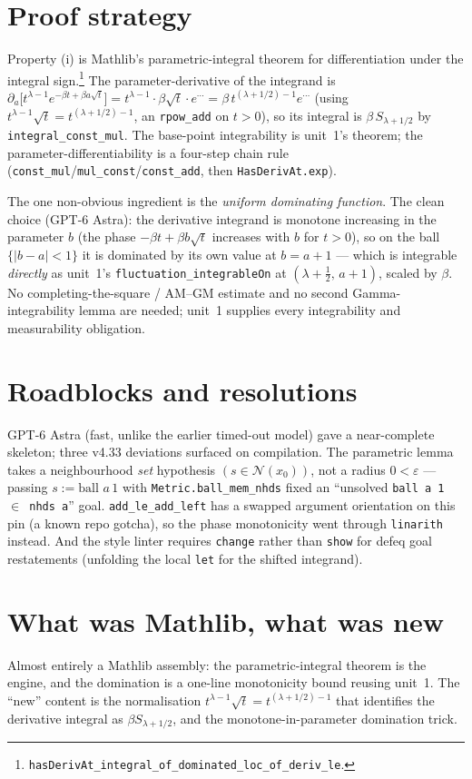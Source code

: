 \documentclass[11pt]{article}
\begin{document}
\section{Proof strategy}
Property (i) is Mathlib's parametric-integral theorem for differentiation under the integral
sign.\footnote{\texttt{hasDerivAt\_integral\_of\_dominated\_loc\_of\_deriv\_le}.} The parameter-derivative of the
integrand is $\partial_a\big[t^{\lambda-1}e^{-\beta t+\beta a\sqrt t}\big]
=t^{\lambda-1}\!\cdot\!\beta\sqrt t\cdot e^{\cdots}=\beta\,t^{(\lambda+1/2)-1}e^{\cdots}$ (using
$t^{\lambda-1}\sqrt t=t^{(\lambda+1/2)-1}$, an \texttt{rpow\_add} on $t>0$), so its integral is
$\beta\,S_{\lambda+1/2}$ by \texttt{integral\_const\_mul}. The base-point integrability is unit~1's
theorem; the parameter-differentiability is a four-step chain rule
(\texttt{const\_mul}/\texttt{mul\_const}/\texttt{const\_add}, then \texttt{HasDerivAt.exp}).

The one non-obvious ingredient is the \emph{uniform dominating function}. The clean choice
(GPT-6 Astra): the derivative integrand is monotone increasing in the parameter $b$ (the phase
$-\beta t+\beta b\sqrt t$ increases with $b$ for $t>0$), so on the ball $\{|b-a|<1\}$ it is dominated
by its own value at $b=a+1$ --- which is integrable \emph{directly} as unit~1's
\texttt{fluctuation\_integrableOn} at $(\lambda+\tfrac12,\,a+1)$, scaled by $\beta$. No
completing-the-square / AM--GM estimate and no second Gamma-integrability lemma are needed; unit~1
supplies every integrability and measurability obligation.

\section{Roadblocks and resolutions}
GPT-6 Astra (fast, unlike the earlier timed-out model) gave a near-complete skeleton; three v4.33
deviations surfaced on compilation. The parametric lemma takes a neighbourhood \emph{set}
hypothesis $(s\in\mathcal N(x_0))$, not a radius $0<\varepsilon$ --- passing $s:=\text{ball }a\,1$ with
\texttt{Metric.ball\_mem\_nhds} fixed an ``unsolved \texttt{ball a 1 $\in$ nhds a}'' goal.
\texttt{add\_le\_add\_left} has a swapped argument orientation on this pin (a known repo gotcha), so
the phase monotonicity went through \texttt{linarith} instead. And the style linter requires
\texttt{change} rather than \texttt{show} for defeq goal restatements (unfolding the local
\texttt{let} for the shifted integrand).

\section{What was Mathlib, what was new}
Almost entirely a Mathlib assembly: the parametric-integral theorem is the engine, and the
domination is a one-line monotonicity bound reusing unit~1. The ``new'' content is the normalisation
$t^{\lambda-1}\sqrt t=t^{(\lambda+1/2)-1}$ that identifies the derivative integral as $\beta
S_{\lambda+1/2}$, and the monotone-in-parameter domination trick.
\end{document}
